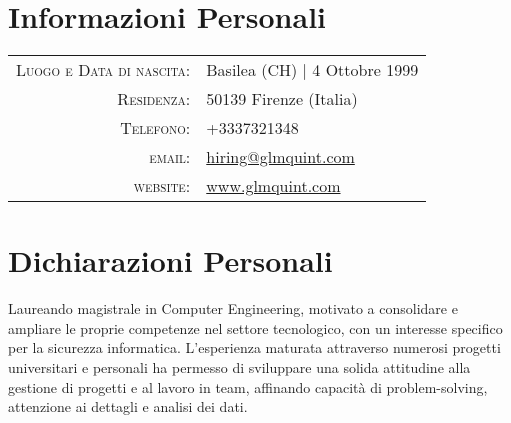 \documentclass[a4paper,11pt]{article} %
\begin{document}
\pagestyle{fancy} %
\fancyhead{}
\renewcommand{\headrulewidth}{0pt}
\cfoot{}


\par{\bigskip\par} %

\section{Informazioni Personali}

\begin{tabular}{rl}
\textsc{Luogo e Data di nascita:} & Basilea (CH) | 4 Ottobre 1999\\
\textsc{Residenza:} & 50139 Firenze (Italia) \\
\textsc{Telefono:} & +3337321348\\
\textsc{email:} & \href{mailto:hiring@glmquint.com}{hiring@glmquint.com}\\
\textsc{website:} & \href{www.glmquint.com}{www.glmquint.com}
\end{tabular}


\section{Dichiarazioni Personali}

Laureando magistrale in Computer Engineering, motivato a consolidare e ampliare le proprie competenze nel settore tecnologico, con un interesse specifico per la sicurezza informatica. L'esperienza maturata attraverso numerosi progetti universitari e personali ha permesso di sviluppare una solida attitudine alla gestione di progetti e al lavoro in team, affinando capacità di problem-solving, attenzione ai dettagli e analisi dei dati.


\end{document}
